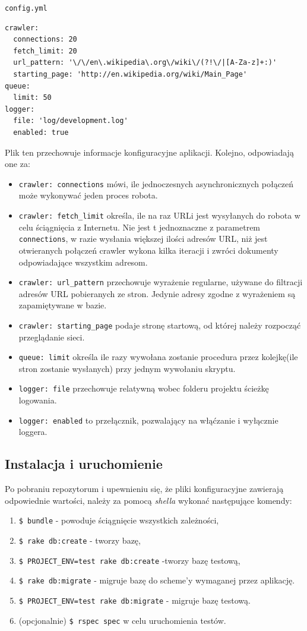 \texttt{config.yml}

\lstset{language=ruby}
\begin{lstlisting}[frame=single]
crawler:
  connections: 20
  fetch_limit: 20
  url_pattern: '\/\/en\.wikipedia\.org\/wiki\/(?!\/|[A-Za-z]+:)'
  starting_page: 'http://en.wikipedia.org/wiki/Main_Page'
queue:
  limit: 50
logger:
  file: 'log/development.log'
  enabled: true

\end{lstlisting}

Plik ten przechowuje informacje konfiguracyjne aplikacji. Kolejno, odpowiadają one za:
\begin{itemize}
\item \texttt{crawler: connections} mówi, ile jednoczesnych asynchronicznych połączeń może wykonywać jeden proces robota.
\item \texttt{crawler: fetch\_limit} określa, ile na raz URLi jest wysyłanych do robota w celu ściągnięcia z Internetu. Nie jest t jednoznaczne z parametrem \texttt{connections}, 
w razie wysłania większej ilości adresów URL, niż jest otwieranych połączeń crawler wykona kilka iteracji i zwróci dokumenty odpowiadające wszystkim adresom.
\item \texttt{crawler: url\_pattern} przechowuje wyrażenie regularne, używane do filtracji adresów URL pobieranych ze stron. Jedynie adresy zgodne z wyrażeniem są zapamiętywane w bazie.
\item \texttt{crawler: starting\_page} podaje stronę startową, od której należy rozpocząć przeglądanie sieci.
\item \texttt{queue: limit} określa ile razy wywołana zostanie procedura przez kolejkę(ile stron zostanie wysłanych) przy jednym wywołaniu skryptu.
\item \texttt{logger: file} przechowuje relatywną wobec folderu projektu ścieżkę logowania.
\item \texttt{logger: enabled} to przełącznik, pozwalający na włąćzanie i wyłącznie loggera.
\end{itemize}

\subsection{Instalacja i uruchomienie}
\label{subs:instalacjaMri}

Po pobraniu repozytorum i upewnieniu się, że pliki konfiguracyjne zawierają odpowiednie wartości, należy za pomocą \emph{shella} wykonać następujące komendy:
\begin{enumerate}
\item \texttt{\$ bundle} - powoduje ściągnięcie wszystkich zależności,
\item \texttt{\$ rake db:create} - tworzy bazę,
\item \texttt{\$ PROJECT\_ENV=test rake db:create} -tworzy bazę testową,
\item \texttt{\$ rake db:migrate} - migruje bazę do scheme'y wymaganej przez aplikację.
\item \texttt{\$ PROJECT\_ENV=test rake db:migrate} - migruje bazę testową.
\item (opcjonalnie) \texttt{\$ rspec spec} w celu uruchomienia testów.
\end{enumerate}


